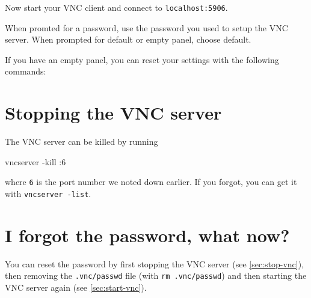 Now start your VNC client and connect to \lstinline|localhost:5906|.

When promted for a password, use the password you used to setup the VNC server.
When prompted for default or empty panel, choose default.

If you have an empty panel, you can reset your settings with the following commands:

\begin{prompt}
\end{prompt}

\section{Stopping the VNC server}
\label{sec:stop-vnc}

The VNC server can be killed by running

\begin{prompt}
vncserver -kill :6
\end{prompt}

where \lstinline|6| is the port number we noted down earlier. If you forgot,
you can get it with \lstinline|vncserver -list|.

\section{I forgot the password, what now?}

You can reset the password by first stopping the VNC server (see \autoref{sec:stop-vnc}),
then removing the \lstinline|.vnc/passwd| file (with \lstinline|rm .vnc/passwd|) and then
starting the VNC server again (see \autoref{sec:start-vnc}).
